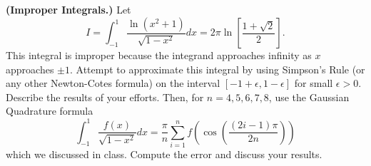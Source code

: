 \textbf{(Improper Integrals.)} Let \[
I = \int_{-1}^1 \frac{\ln (x^2 + 1 )}{\sqrt{1 - x^2}} dx = 2 \pi \ln
\left[ \frac{1 + \sqrt{2}}{2} \right].
\]
This integral is improper because the integrand approaches infinity as
$x$ approaches $\pm 1$. Attempt to approximate this integral by using
Simpson's Rule (or any other Newton-Cotes formula) on the interval
$[-1 + \epsilon, 1 - \epsilon]$ for small $\epsilon > 0$. Describe the
results of your efforts. Then, for $n = 4, 5, 6, 7, 8$, use the
Gaussian Quadrature formula \[
\int_{-1}^1 \frac{f(x)}{\sqrt{1 - x^2}} dx = \frac{\pi}{n}
\sum_{i=1}^n f\left( \cos \left( \frac{(2i - 1) \pi}{2n} \right) \right)
\] which we discussed in class. Compute the error and discuss your results.

{\color{blue}



}
